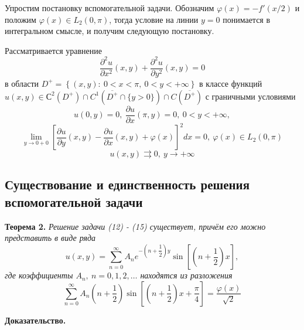 \documentclass[12pt, a4paper]{article}
\begin{document}
Упростим постановку вспомогательной задачи. Обозначим $\varphi(x) = -f'(x/2)$ и положим $\varphi(x) \in L_2(0, \pi)$, тогда условие на линии $y = 0$ понимается в интегральном смысле, и получим следующую постановку.


Рассматривается уравнение
\begin{equation}
	\dfrac{\partial^2 u}{\partial x^2}(x,y) + \dfrac{\partial^2 u}{\partial y^2}(x,y) = 0
\end{equation}
в области $D^{+} = \left\{(x,y): \ 0 < x < \pi, \ 0 < y < + \infty \right\}$ в классе функций $u(x,y) \in С^2(D^+) \cap C^1(\overline{D^+} \cap \{y > 0\}) \cap C(\overline{D^+})$ 
с граничными условиями 
\begin{equation}
	u(0,y) = 0, \ \dfrac{\partial u}{\partial x}(\pi, y) = 0, \ 0 < y < +\infty, 
\end{equation}
\begin{equation}
	\lim\limits_{y \to 0+0} \left[\dfrac{\partial u}{\partial y}(x, y) - \dfrac{\partial u}{\partial x}(x,y) + \varphi(x) \right]^2   dx = 0, \ \varphi(x) \in L_2(0, \pi)
\end{equation}
\begin{equation}
	u(x,y) \rightrightarrows 0, \ y \to +\infty 
\end{equation}

\subsection{Существование и единственность решения вспомогательной задачи}

\textbf{Теорема 2.} \textit{	Решение задачи (12) - (15) существует, причём его можно представить в виде ряда
	\begin{equation}
		u(x,y) = \sum\limits_{n=0}^{\infty} A_n e^{-\left(n + \dfrac12\right)y} \sin{\left[\left(n + \dfrac12\right)x\right]},
	\end{equation}
	где коэффициенты $A_n, \ n =0,1,2, \dots$ находятся из разложения
	\begin{equation}
		\sum\limits_{n=0}^{\infty} A_n \left(n + \dfrac12 \right) \sin{\left[\left(n +\dfrac12\right)x + \dfrac\pi4\right]} = \dfrac{\varphi(x)}{\sqrt2}
\end{equation}}

\textbf{Доказательство.} 
\end{document}
